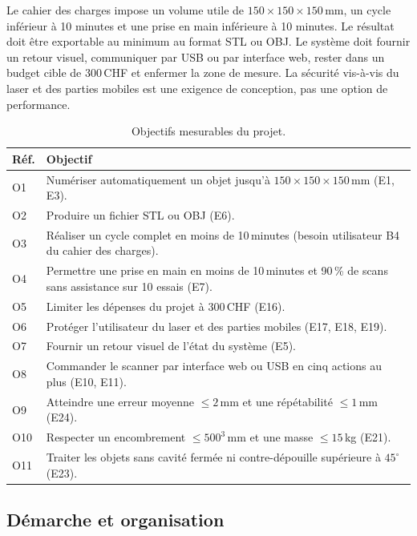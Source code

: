 Le cahier des charges impose un volume utile de
$150\times150\times150$\,mm, un cycle inférieur à 10 minutes et une prise en
main inférieure à 10 minutes. Le résultat doit être exportable au minimum au
format STL ou OBJ. Le système doit fournir un retour visuel, communiquer par
USB ou par interface web, rester dans un budget cible de 300\,CHF et enfermer
la zone de mesure. La sécurité vis-à-vis du laser et des parties mobiles est
une exigence de conception, pas une option de performance.

\begin{table}[H]
  \centering
  \small
  \begin{tabular}{@{}p{1.2cm}p{12.5cm}@{}}
    \toprule
    \textbf{Réf.} & \textbf{Objectif} \\
    \midrule
    O1 & Numériser automatiquement un objet jusqu'à $150\times150\times150$\,mm (E1, E3). \\
    O2 & Produire un fichier STL ou OBJ (E6). \\
    O3 & Réaliser un cycle complet en moins de 10\,minutes (besoin utilisateur B4 du cahier des charges). \\
    O4 & Permettre une prise en main en moins de 10\,minutes et 90\,\% de scans sans assistance sur 10 essais (E7). \\
    O5 & Limiter les dépenses du projet à 300\,CHF (E16). \\
    O6 & Protéger l'utilisateur du laser et des parties mobiles (E17, E18, E19). \\
    O7 & Fournir un retour visuel de l'état du système (E5). \\
    O8 & Commander le scanner par interface web ou USB en cinq actions au plus (E10, E11). \\
    O9 & Atteindre une erreur moyenne $\leq 2$\,mm et une répétabilité $\leq 1$\,mm (E24). \\
    O10 & Respecter un encombrement $\leq 500^3$\,mm et une masse $\leq 15$\,kg (E21). \\
    O11 & Traiter les objets sans cavité fermée ni contre-dépouille supérieure à $45^\circ$ (E23). \\
    \bottomrule
  \end{tabular}
  \caption{Objectifs mesurables du projet.}
  \label{tab:objectifs}
\end{table}

\subsection{Démarche et organisation}

